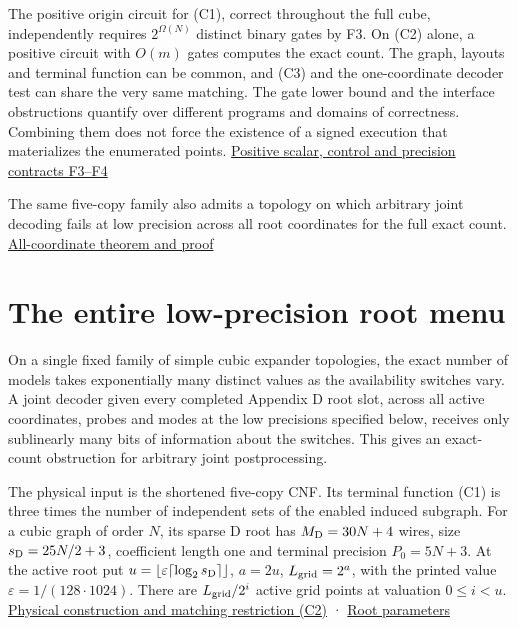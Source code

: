 \documentclass[11pt,a4paper]{article}
\begin{document}
The positive origin circuit for (C1), correct throughout the full cube,
independently requires \(2^{\Omega(N)}\) distinct binary gates by F3. On
(C2) alone, a positive circuit with \(O(m)\) gates computes the exact
count. The graph, layouts and terminal function can be common, and (C3)
and the one-coordinate decoder test can share the very same matching.
The gate lower bound and the interface obstructions quantify over
different programs and domains of correctness. Combining them does not
force the existence of a signed execution that materializes the
enumerated points. \hyperref[v8-section-stronger-family]{Positive scalar,
control and precision contracts F3--F4}

The same five-copy family also admits a topology on which arbitrary
joint decoding fails at low precision across all root coordinates for
the full exact count.
\hyperref[v8-section-pooled-menu-barrier]{All-coordinate theorem and proof}

\section{The entire low-precision root
menu}\label{v8-section-pooled-menu-barrier}

On a single fixed family of simple cubic expander topologies, the exact
number of models takes exponentially many distinct values as the
availability switches vary. A joint decoder given every completed
Appendix D root slot, across all active coordinates, probes and modes at
the low precisions specified below, receives only sublinearly many bits
of information about the switches. This gives an exact-count obstruction
for arbitrary joint postprocessing.

The physical input is the shortened five-copy CNF. Its terminal function
(C1) is three times the number of independent sets of the enabled
induced subgraph. For a cubic graph of order \(N\), its sparse D root
has \(M_{\rm D}=30N+4\) wires, size \(s_{\rm D}=25N/2+3\), coefficient
length one and terminal precision \(P_0=5N+3\). At the active root put
\(u=\lfloor\varepsilon\lceil\log_2s_{\rm D}\rceil\rfloor\), \(a=2u\),
\(L_{\rm grid}=2^a\), with the printed value
\(\varepsilon=1/(128\cdot1024)\). There are \(L_{\rm grid}/2^i\) active
grid points at valuation \(0\le i<u\).
\hyperref[v8-section-common-native-family]{Physical construction and
matching restriction (C2)} ·
\href{https://github.com/openai/math/blob/main/preprints/The-Exponential-Time-Hypothesis-is-False-October-25-2026/build/quantitative-contraction.tex\#L73}{Root
parameters}
\end{document}
